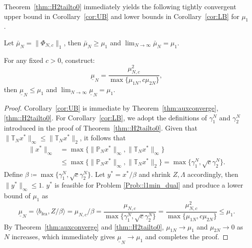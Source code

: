 Theorem~\ref{thm::H2tailto0} immediately yields the following tightly convergent upper bound in Corollary~\ref{cor:UB} and lower bounds in Corollary~\ref{cor:LB} for \(\mu_1\).
\begin{cor}\label{cor:UB}
Let \(\bar{\mu}_N = \|\Phi_{N,c}\|_1\), then \(\bar{\mu}_N\geq\mu_1\) and \(\lim_{N\rightarrow \infty} \bar{\mu}_N = \mu_1\).
\end{cor}
\begin{cor}\label{cor:LB}
For any fixed \(c>0\), construct:
\[
\underline{\mu}_N = \frac{\mu_{N,c}^2}{\max\{\mu_{1N},c \mu_{2N}\}}, 
\]    
then \(\underline{\mu}_N\leq\mu_1\) and \(\lim_{N\rightarrow \infty} \underline{\mu}_N = \mu_1\).
\end{cor}
\begin{proof}
Corollary~\ref{cor:UB} is immediate by Theorem~\ref{thm:auxconverge},\ref{thm::H2tailto0}.
For Corollary~\ref{cor:LB}, we adopt the definitions of \(\gamma_1^N\) and \(\gamma_2^N\) introduced in the proof of Theorem~\ref{thm::H2tailto0}.
Given that \(\|\mathbb{T}_N x^*\|_\infty \leq \|\mathbb{T}_N x^*\|_2\), it follows that 
\[
\begin{split}
\|x^*\|_\infty & = \max \{\|\mathbb{P}_N x^*\|_\infty,\|\mathbb{T}_N x^*\|_\infty\} \\
& \leq \max \{\|\mathbb{P}_N x^*\|_\infty,\|\mathbb{T}_N x^*\|_2\} = \max \{\gamma_1^N,\sqrt{c} \gamma_2^N\}.  
\end{split}
\]
Define \(\beta \coloneqq \max\{\gamma_1^N, \sqrt{c} \gamma_2^N\}\). Let \(y^* = x^*/\beta\) and shrink \(Z,\Lambda\) accordingly, then \(\|y^*\|_\infty\le 1\). \(y^*\) is feasible for Problem \ref{Prob::l1min_dual} and produce a lower bound of \(\mu_1\) as
\begin{equation}
    \underline{\mu}_N = \langle b_\mathrm{fea}, Z/\beta \rangle = \mu_{N,c}/\beta= \frac{\mu_{N,c}}{\max\{\gamma_1^N,\sqrt{c}\gamma_2^N\}}
    = \frac{\mu_{N,c}^2}{\max\{\mu_{1N},c \mu_{2N}\}} \leq \mu_1.
\end{equation}
By Theorem~\ref{thm:auxconverge} and \ref{thm::H2tailto0}, \(\mu_{1N} \to \mu_1\) and \(\mu_{2N}\to 0\) as \(N\) increases, which immediately gives \(\underline{\mu}_N\to\mu_1\) and completes the proof. 
\end{proof}



